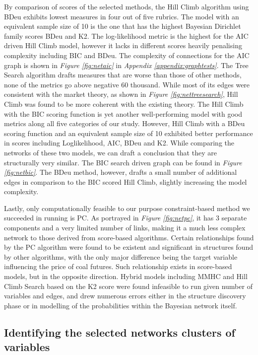 \documentclass[12pt, letterpaper]{article}
\begin{document}
By comparison of scores of the selected methods, the Hill Climb algorithm using BDeu exhibits lowest measures in four out of five rubrics. The model with an equivalent sample size of 10 is the one that has the highest Bayesian Dirichlet family scores BDeu and K2. The log-likelihood metric is the highest for the AIC driven Hill Climb model, however it lacks in different scores heavily penalising complexity including BIC and BDeu. The complexity of connections for the AIC graph is shown in \textit{Figure \ref{fig:netaic}} in \textit{Appendix \ref{appendix:graphtests}}. The Tree Search algorithm drafts measures that are worse than those of other methods, none of the metrics go above negative 60 thousand. While most of its edges were consistent with the market theory, as shown in \textit{Figure \ref{fig:nettreesearch}}, Hill Climb was found to be more coherent with the existing theory. The Hill Climb with the BIC scoring function is yet another well-performing model with good metrics along all five categories of our study. However, Hill Climb with a BDeu scoring function and an equivalent sample size of 10 exhibited better performance in scores including Loglikelihood, AIC, BDeu and K2. While comparing the networks of these two models, we can draft a conclusion that they are structurally very similar. The BIC search driven graph can be found in \textit{Figure \ref{fig:netbic}}. The BDeu method, however, drafts a small number of additional edges in comparison to the BIC scored Hill Climb, slightly increasing the model complexity.

Lastly, only computationally feasible to our purpose constraint-based method we succeeded in running is PC. As portrayed in \textit{Figure \ref{fig:netpc}}, it has 3 separate components and a very limited number of links, making it a much less complex network to those derived from score-based algorithms. Certain relationships found by the PC algorithm were found to be existent and significant in structures found by other algorithms, with the only major difference being the target variable influencing the price of coal futures. Such relationship exists in score-based models, but in the opposite direction. Hybrid models including MMHC and Hill Climb Search based on the K2 score were found infeasible to run given number of variables and edges, and drew numerous errors either in the structure discovery phase or in modelling of the probabilities within the Bayesian network itself. 

\subsection{Identifying the selected networks clusters of variables}
\end{document}
